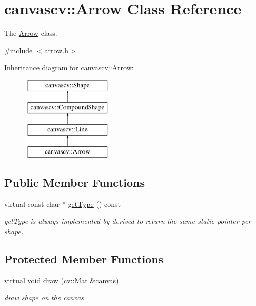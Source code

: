 \hypertarget{classcanvascv_1_1Arrow}{}\section{canvascv\+:\+:Arrow Class Reference}
\label{classcanvascv_1_1Arrow}


The \hyperlink{classcanvascv_1_1Arrow}{Arrow} class.  




{\ttfamily \#include $<$arrow.\+h$>$}

Inheritance diagram for canvascv\+:\+:Arrow\+:\begin{figure}[H]
\begin{center}
\leavevmode
\includegraphics[height=4.000000cm]{classcanvascv_1_1Arrow}
\end{center}
\end{figure}
\subsection*{Public Member Functions}
\begin{DoxyCompactItemize}
\item 
virtual const char $\ast$ \hyperlink{classcanvascv_1_1Arrow_a4d0857dec7276f993bd390e944edef34}{get\+Type} () const 
\begin{DoxyCompactList}\small\item\em get\+Type is always implemented by derived to return the same static pointer per shape. \end{DoxyCompactList}\end{DoxyCompactItemize}
\subsection*{Protected Member Functions}
\begin{DoxyCompactItemize}
\item 
virtual void \hyperlink{classcanvascv_1_1Arrow_a8ba5b890df49a2d8fc6630df5fe80351}{draw} (cv\+::\+Mat \&canvas)
\begin{DoxyCompactList}\small\item\em draw shape on the canvas \end{DoxyCompactList}\end{DoxyCompactItemize}
